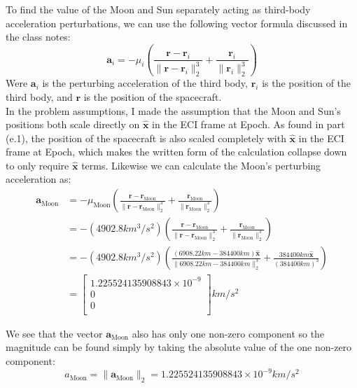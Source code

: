 \documentclass[titlepage]{article}
\begin{document}
To find the value of the Moon and Sun separately acting as third-body acceleration perturbations, we can use the following vector formula discussed in the class notes:
\begin{equation}
	\boldsymbol{a}_i=-\mu_i\left(\frac{\boldsymbol{r}-\boldsymbol{r}_i}{\|\boldsymbol{r}-\boldsymbol{r}_i\|_2^3}+\frac{\boldsymbol{r}_i}{\|\boldsymbol{r}_i\|_2^3}\right)
\end{equation}
Were $\boldsymbol{a}_i$ is the perturbing acceleration of the third body, $\boldsymbol{r}_i$ is the position of the third body, and $\boldsymbol{r}$ is the position of the spacecraft.\\

In the problem assumptions, I made the assumption that the Moon and Sun's positions both scale directly on $\hat{\boldsymbol{x}}$ in the ECI frame at Epoch. As found in part (e.1), the position of the spacecraft is also scaled completely with $\hat{\boldsymbol{x}}$ in the ECI frame at Epoch, which makes the written form of the calculation collapse down to only require $\hat{\boldsymbol{x}}$ terms. Likewise we can calculate the Moon's perturbing acceleration as:
\small
\begin{equation}
	\begin{split}
		\boldsymbol{a}_\text{Moon}&=-\mu_\text{Moon}\left(\frac{\boldsymbol{r}-\boldsymbol{r}_\text{Moon}}{\|\boldsymbol{r}-\boldsymbol{r}_\text{Moon}\|_2^3}+\frac{\boldsymbol{r}_\text{Moon}}{\|\boldsymbol{r}_\text{Moon}\|_2^3}\right)\\
		&=-\left(4902.8km^3/s^2\right)\left(\frac{\boldsymbol{r}-\boldsymbol{r}_\text{Moon}}{\|\boldsymbol{r}-\boldsymbol{r}_\text{Moon}\|_2^3}+\frac{\boldsymbol{r}_\text{Moon}}{\|\boldsymbol{r}_\text{Moon}\|_2^3}\right)\\
		&=-\left(4902.8km^3/s^2\right)\left(\frac{(6908.22km-384400km)\hat{\boldsymbol{x}}}{\|6908.22km-384400km\|_2^3}+\frac{384400km\hat{\boldsymbol{x}}}{(384400km)^3}\right)\\
		&=\begin{bmatrix}
			1.225524135908843\times10^{-9} \\
			0 \\
			0 \\
		\end{bmatrix}km/s^2
	\end{split}
\end{equation}
\normalsize
\begin{mdframed}[linewidth=1pt, innertopmargin=10pt, innerbottommargin=10pt]
	We see that the vector $\boldsymbol{a}_\text{Moon}$ also has only one non-zero component so the magnitude can be found simply by taking the absolute value of the one non-zero component:
	\begin{equation}
		a_\text{Moon} = \|\boldsymbol{a}_\text{Moon}\|_2=1.225524135908843\times10^{-9}km/s^2
	\end{equation}
\end{mdframed}
\end{document}
